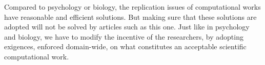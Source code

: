 \documentclass[a4paper,11pt]{article}
\begin{document}

Compared to psychology or biology, the replication issues of computational works have reasonable and efficient solutions. But making sure that these solutions are adopted will not be solved by articles such as this one. Just like in psychology and biology, we have to modify the incentive of the researchers, by adopting exigences, enforced domain-wide, on what constitutes an acceptable scientific computational work.


\renewcommand*{\bibfont}{\small}
\printbibliography[title=References]


\end{document}
